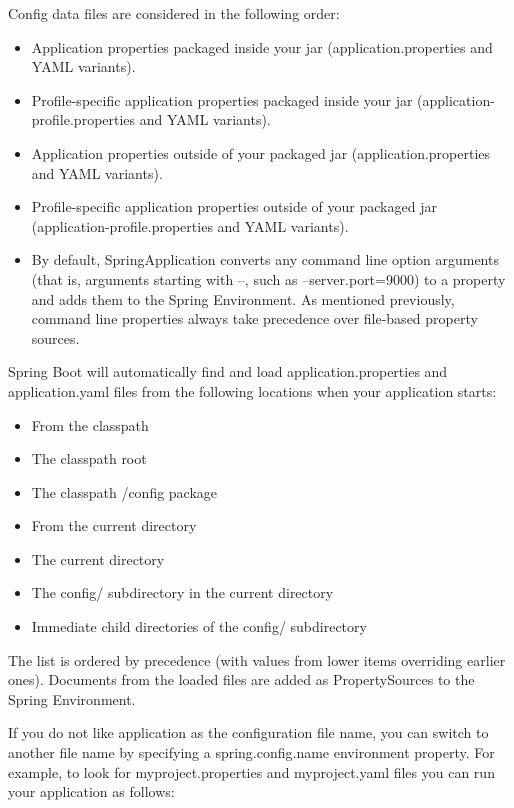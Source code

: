 \documentclass{scrartcl}
\begin{document}
Config data files are considered in the following order:

\begin{itemize}
    \item Application properties packaged inside your jar (application.properties and YAML variants).
    \item Profile-specific application properties packaged inside your jar (application-{profile}.properties and YAML variants).
    \item Application properties outside of your packaged jar (application.properties and YAML variants).
    \item Profile-specific application properties outside of your packaged jar (application-{profile}.properties and YAML variants).
    \item By default, SpringApplication converts any command line option arguments (that is, arguments starting with --, such as --server.port=9000) to a property and adds them to the Spring Environment. As mentioned previously, command line properties always take precedence over file-based property sources.
\end{itemize}

Spring Boot will automatically find and load application.properties and application.yaml files from the following locations when your application starts:

\begin{itemize}
    \item From the classpath
    \item The classpath root
    \item The classpath /config package
    \item From the current directory
    \item The current directory
    \item The config/ subdirectory in the current directory
    \item Immediate child directories of the config/ subdirectory
\end{itemize}

The list is ordered by precedence (with values from lower items overriding earlier ones). Documents from the loaded files are added as PropertySources to the Spring Environment.

If you do not like application as the configuration file name, you can switch to another file name by specifying a spring.config.name environment property. For example, to look for myproject.properties and myproject.yaml files you can run your application as follows:
\end{document}
